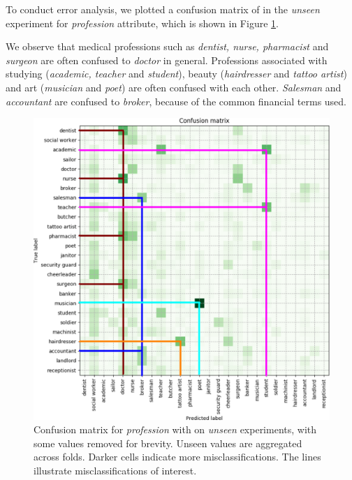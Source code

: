 To conduct error analysis, we plotted a confusion matrix of  in the \emph{unseen} experiment for \emph{profession} attribute, which is shown in Figure \ref{conf_prof}.

We observe that medical professions such as \textit{dentist, nurse, pharmacist} and \emph{surgeon} are often confused to \textit{doctor} in general. Professions associated with studying (\textit{academic, teacher} and \emph{student}), beauty (\textit{hairdresser} and \emph{tattoo artist}) and art (\textit{musician} and \textit{poet}) are often confused with each other. \textit{Salesman} and \emph{accountant} are confused to \textit{broker}, because of the common financial terms used. 


\begin{figure}[h!]
 \centering
   \centering
   \includegraphics[scale=0.5]{imgs/profession_confusion.pdf}
\vspace{0.3cm}
\caption{Confusion matrix for \emph{profession}  with  on \emph{unseen} experiments, with some values removed for brevity. Unseen values are aggregated across folds. 
Darker cells indicate more misclassifications. The lines illustrate misclassifications of interest.
}
   \label{conf_prof}
\end{figure}

